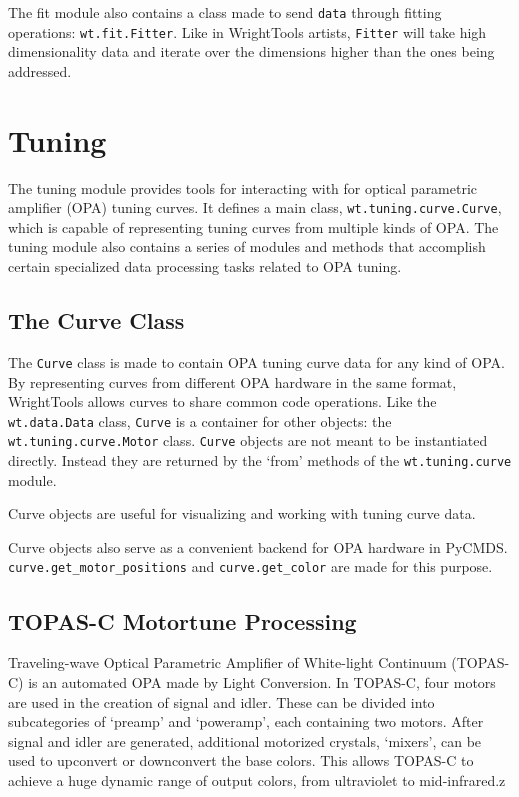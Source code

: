 	The fit module also contains a class made to send \texttt{data} through fitting operations: \texttt{wt.fit.Fitter}. Like in WrightTools artists, \texttt{Fitter} will take high dimensionality data and iterate over the dimensions higher than the ones being addressed.

\pagebreak
\section{Tuning}

The tuning module provides tools for interacting with for optical parametric amplifier (OPA) tuning curves. It defines a main class, \texttt{wt.tuning.curve.Curve}, which is capable of representing tuning curves from multiple kinds of OPA. The tuning module also contains a series of modules and methods that accomplish certain specialized data processing tasks related to OPA tuning.

\subsection{The Curve Class}

The \texttt{Curve} class is made to contain OPA tuning curve data for any kind of OPA. By representing curves from different OPA hardware in the same format, WrightTools allows curves to share common code operations. Like the \texttt{wt.data.Data} class, \texttt{Curve} is a container for other objects: the \texttt{wt.tuning.curve.Motor} class. \texttt{Curve} objects are not meant to be instantiated directly. Instead they are returned by the `from' methods of the \texttt{wt.tuning.curve} module. 

Curve objects are useful for visualizing and working with tuning curve data. 

Curve objects also serve as a convenient backend for OPA hardware in PyCMDS. \texttt{curve.get\_motor\_positions} and \texttt{curve.get\_color} are made for this purpose.

\subsection{TOPAS-C Motortune Processing}

Traveling-wave Optical Parametric Amplifier of White-light Continuum (TOPAS-C) is an automated OPA made by Light Conversion. In TOPAS-C, four motors are used in the creation of signal and idler. These can be divided into subcategories of `preamp' and `poweramp', each containing two motors. After signal and idler are generated, additional motorized crystals, `mixers', can be used to upconvert or downconvert the base colors. This allows TOPAS-C to achieve a huge dynamic range of output colors, from ultraviolet to mid-infrared.z

